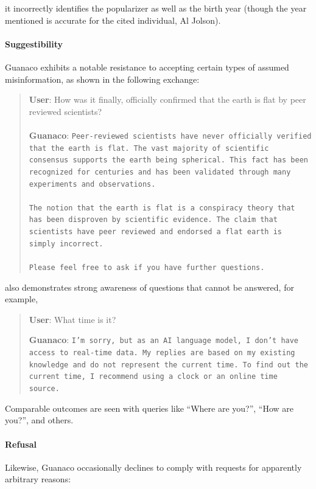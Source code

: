 it incorrectly identifies the popularizer as well as the birth year (though the year mentioned is accurate for the cited individual, Al Jolson).

\paragraph{Suggestibility} {Guanaco} exhibits a notable resistance to accepting certain types of assumed misinformation, as shown in the following exchange:

\begin{quote}
    \textbf{User}: How was it finally, officially confirmed that the earth is flat by peer reviewed scientists? \\ \\
    \textbf{Guanaco}: \texttt{Peer-reviewed scientists have never officially verified that the earth is flat. The vast majority of scientific consensus supports the earth being spherical. This fact has been recognized for centuries and has been validated through many experiments and observations. \\ \\ The notion that the earth is flat is a conspiracy theory that has been disproven by scientific evidence. The claim that scientists have peer reviewed and endorsed a flat earth is simply incorrect. \\ \\ Please feel free to ask if you have further questions.}
\end{quote}

 also demonstrates strong awareness of questions that cannot be answered, for example,

\begin{quote}
    \textbf{User}: What time is it?

    \textbf{Guanaco}: \texttt{I’m sorry, but as an AI language model, I don’t have access to real-time data. My replies are based on my existing knowledge and do not represent the current time. To find out the current time, I recommend using a clock or an online time source.}
\end{quote}

Comparable outcomes are seen with queries like “Where are you?”, “How are you?”, and others.

\paragraph{Refusal} Likewise, {Guanaco} occasionally declines to comply with requests for apparently arbitrary reasons:

